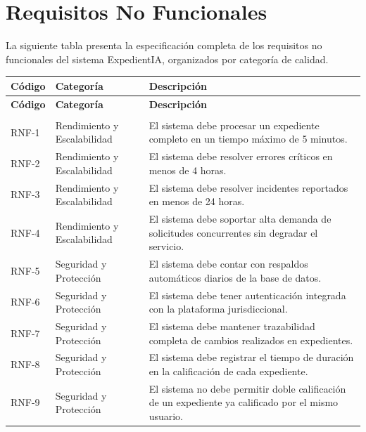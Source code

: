\documentclass[12pt,a4paper,oneside]{book}
\begin{document}
\chapter{Requisitos No Funcionales}
\label{anexo:requerimientos-no-funcionales}

La siguiente tabla presenta la especificación completa de los requisitos no funcionales del sistema ExpedientIA, organizados por categoría de calidad.

\begingroup
\small
\setlength{\LTpre}{0pt}
\setlength{\LTpost}{0pt}
\begin{longtable}{@{}>{\centering\arraybackslash}p{2cm}
                    >{\centering\arraybackslash}p{3cm}
                    >{\raggedright\arraybackslash}p{10cm}@{}}
\toprule
\textbf{Código} & \textbf{Categoría} & \textbf{Descripción} \\
\midrule
\endfirsthead
\toprule
\textbf{Código} & \textbf{Categoría} & \textbf{Descripción} \\
\midrule
\endhead
\midrule
\multicolumn{3}{r}{\textit{Continúa en la siguiente página}} \\
\endfoot
\bottomrule
\endlastfoot
RNF-1 & Rendimiento y Escalabilidad & El sistema debe procesar un expediente completo en un tiempo máximo de 5 minutos. \\
RNF-2 & Rendimiento y Escalabilidad & El sistema debe resolver errores críticos en menos de 4 horas. \\
RNF-3 & Rendimiento y Escalabilidad & El sistema debe resolver incidentes reportados en menos de 24 horas. \\
RNF-4 & Rendimiento y Escalabilidad & El sistema debe soportar alta demanda de solicitudes concurrentes sin degradar el servicio. \\
\midrule
RNF-5 & Seguridad y Protección & El sistema debe contar con respaldos automáticos diarios de la base de datos. \\
RNF-6 & Seguridad y Protección & El sistema debe tener autenticación integrada con la plataforma jurisdiccional. \\
RNF-7 & Seguridad y Protección & El sistema debe mantener trazabilidad completa de cambios realizados en expedientes. \\
RNF-8 & Seguridad y Protección & El sistema debe registrar el tiempo de duración en la calificación de cada expediente. \\
RNF-9 & Seguridad y Protección & El sistema no debe permitir doble calificación de un expediente ya calificado por el mismo usuario. \\

\end{longtable}
\end{document}
